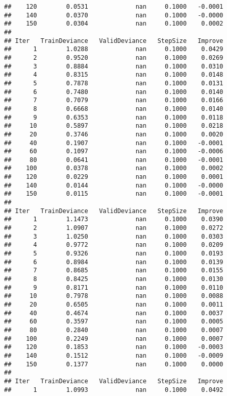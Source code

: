 \documentclass[]{article}
\begin{document}
\begin{verbatim}
##    120        0.0531             nan     0.1000   -0.0001
##    140        0.0370             nan     0.1000   -0.0000
##    150        0.0304             nan     0.1000    0.0002
## 
## Iter   TrainDeviance   ValidDeviance   StepSize   Improve
##      1        1.0288             nan     0.1000    0.0429
##      2        0.9520             nan     0.1000    0.0269
##      3        0.8884             nan     0.1000    0.0310
##      4        0.8315             nan     0.1000    0.0148
##      5        0.7878             nan     0.1000    0.0131
##      6        0.7480             nan     0.1000    0.0140
##      7        0.7079             nan     0.1000    0.0166
##      8        0.6668             nan     0.1000    0.0140
##      9        0.6353             nan     0.1000    0.0118
##     10        0.5897             nan     0.1000    0.0218
##     20        0.3746             nan     0.1000    0.0020
##     40        0.1907             nan     0.1000   -0.0001
##     60        0.1097             nan     0.1000   -0.0006
##     80        0.0641             nan     0.1000   -0.0001
##    100        0.0378             nan     0.1000    0.0002
##    120        0.0229             nan     0.1000    0.0001
##    140        0.0144             nan     0.1000   -0.0000
##    150        0.0115             nan     0.1000   -0.0001
## 
## Iter   TrainDeviance   ValidDeviance   StepSize   Improve
##      1        1.1473             nan     0.1000    0.0390
##      2        1.0907             nan     0.1000    0.0272
##      3        1.0250             nan     0.1000    0.0303
##      4        0.9772             nan     0.1000    0.0209
##      5        0.9326             nan     0.1000    0.0193
##      6        0.8984             nan     0.1000    0.0139
##      7        0.8685             nan     0.1000    0.0155
##      8        0.8425             nan     0.1000    0.0130
##      9        0.8171             nan     0.1000    0.0110
##     10        0.7978             nan     0.1000    0.0088
##     20        0.6505             nan     0.1000    0.0011
##     40        0.4674             nan     0.1000    0.0037
##     60        0.3597             nan     0.1000    0.0005
##     80        0.2840             nan     0.1000    0.0007
##    100        0.2249             nan     0.1000    0.0007
##    120        0.1853             nan     0.1000   -0.0003
##    140        0.1512             nan     0.1000   -0.0009
##    150        0.1377             nan     0.1000    0.0000
## 
## Iter   TrainDeviance   ValidDeviance   StepSize   Improve
##      1        1.0993             nan     0.1000    0.0492

\end{verbatim}
\end{document}
